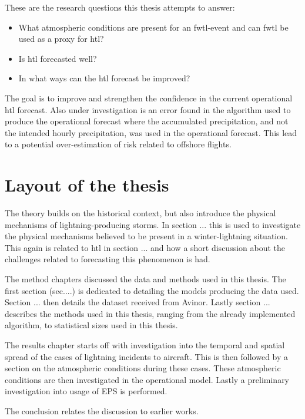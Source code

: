 These are the research questions this thesis attempts to answer:
\begin{itemize}	
    \item What atmospheric conditions are present for an \acrshort{fwtl}-event and can \acrshort{fwtl} be used as a proxy for \acrshort{htl}? 
    \item Is \acrshort{htl} forecasted well?
    \item In what ways can the \acrshort{htl} forecast be improved?
\end{itemize}

The goal is to improve and strengthen the confidence in the current operational \acrshort{htl} forecast. Also under investigation is an error found in the algorithm used to produce the operational forecast where the accumulated precipitation, and not the intended hourly precipitation, was used in the operational forecast. This lead to a potential over-estimation of risk related to offshore flights.

\section{Layout of the thesis}

The theory builds on the historical context, but also introduce the physical mechanisms of lightning-producing storms. In section ... this is used to investigate the physical mechanisms believed to be present in a winter-lightning situation. This again is related to \acrfull{htl} in section ... and how a short discussion about the challenges related to forecasting this phenomenon is had.

The method chapters discussed the data and methods used in this thesis. The first section (sec....) is dedicated to detailing the models producing the data used. Section ... then details the dataset received from Avinor. Lastly section ... describes the methods used in this thesis, ranging from the already implemented algorithm, to statistical sizes used in this thesis.

The results chapter starts off with investigation into the temporal and spatial spread of the cases of lightning incidents to aircraft. This is then followed by a section on the atmospheric conditions during these cases. These atmospheric conditions are then investigated in the operational model. Lastly a preliminary investigation into usage of EPS is performed.

The conclusion relates the discussion to earlier works.



